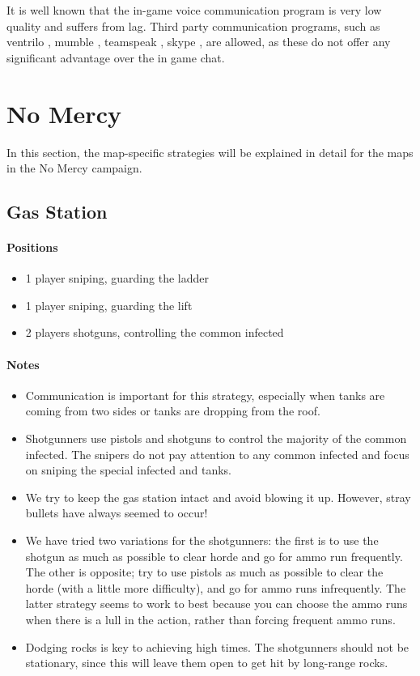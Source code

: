 It is well known that the in-game voice communication program is very low quality and suffers from lag. Third party communication programs, such as ventrilo \cite{web:ventrilo}, mumble \cite{web:mumble}, teamspeak \cite{web:teamspeak}, skype \cite{web:skype}, are allowed, as these do not offer any significant advantage over the in game chat.

\section{No Mercy}
In this section, the map-specific strategies will be explained in detail for the maps in the No Mercy campaign.
\subsection{Gas Station}
\paragraph{Positions}
\begin{itemize}
\item 1 player sniping, guarding the ladder
\item 1 player sniping, guarding the lift
\item 2 players shotguns, controlling the common infected
\end{itemize}

\paragraph{Notes}
\begin{itemize}
\item Communication is important for this strategy, especially when tanks are coming from two sides or tanks are dropping from the roof.
\item Shotgunners use pistols and shotguns to control the majority of the common infected. The snipers do not pay attention to any common infected and focus on sniping the special infected and tanks.
\item We try to keep the gas station intact and avoid blowing it up. However, stray bullets have always seemed to occur!
\item We have tried two variations for the shotgunners: the first is to use the shotgun as much as possible to clear horde and go for ammo run frequently. The other is opposite; try to use pistols as much as possible to clear the horde (with a little more difficulty), and go for ammo runs infrequently. The latter strategy seems to work to best because you can choose the ammo runs when there is a lull in the action, rather than forcing frequent ammo runs.
\item Dodging rocks is key to achieving high times. The shotgunners should not be stationary, since this will leave them open to get hit by long-range rocks.
\end{itemize}

